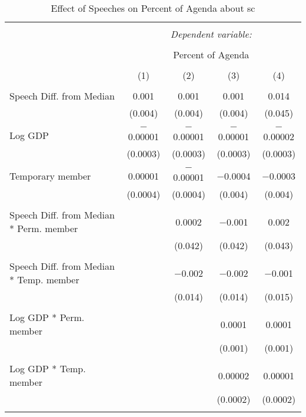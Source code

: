 
\begin{table}[!htbp] \centering 
  \caption{Effect of Speeches on Percent of Agenda about  sc} 
  \label{} 
\begin{tabular}{@{\extracolsep{5pt}}lcccc} 
\\[-1.8ex]\hline 
\hline \\[-1.8ex] 
 & \multicolumn{4}{c}{\textit{Dependent variable:}} \\ 
\cline{2-5} 
\\[-1.8ex] & \multicolumn{4}{c}{Percent of Agenda} \\ 
\\[-1.8ex] & (1) & (2) & (3) & (4)\\ 
\hline \\[-1.8ex] 
 Speech Diff. from Median & 0.001 & 0.001 & 0.001 & 0.014 \\ 
  & (0.004) & (0.004) & (0.004) & (0.045) \\ 
  & & & & \\ 
 Log GDP & $-$0.00001 & $-$0.00001 & $-$0.00001 & $-$0.00002 \\ 
  & (0.0003) & (0.0003) & (0.0003) & (0.0003) \\ 
  & & & & \\ 
 Temporary member & 0.00001 & $-$0.00001 & $-$0.0004 & $-$0.0003 \\ 
  & (0.0004) & (0.0004) & (0.004) & (0.004) \\ 
  & & & & \\ 
 Speech Diff. from Median * Perm. member &  & 0.0002 & $-$0.001 & 0.002 \\ 
  &  & (0.042) & (0.042) & (0.043) \\ 
  & & & & \\ 
 Speech Diff. from Median * Temp. member &  & $-$0.002 & $-$0.002 & $-$0.001 \\ 
  &  & (0.014) & (0.014) & (0.015) \\ 
  & & & & \\ 
 Log GDP * Perm. member &  &  & 0.0001 & 0.0001 \\ 
  &  &  & (0.001) & (0.001) \\ 
  & & & & \\ 
 Log GDP * Temp. member &  &  & 0.00002 & 0.00001 \\ 
  &  &  & (0.0002) & (0.0002) \\ 
  & & & & \\ 

\end{tabular}
\end{table}
